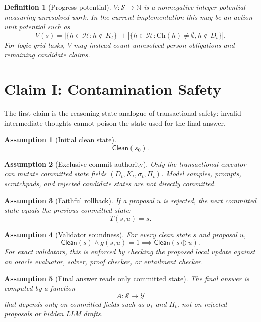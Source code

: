 \documentclass[11pt]{article}
\newtheorem{definition}{Definition}
\newtheorem{assumption}{Assumption}
\newcommand{\State}{\mathcal{S}}
\newcommand{\Obligations}{\mathcal{H}}
\newcommand{\Clean}{\mathsf{Clean}}
\newcommand{\pot}{V}
\begin{document}
\begin{definition}[Progress potential]
$\pot : \State \to \mathbb{N}$ is a nonnegative integer potential measuring
unresolved work. In the current implementation this may be an action-unit
potential such as
\[
\pot(s)=
|\{h \in \Obligations : h \notin K_t\}|
+
|\{h \in \Obligations : \mathrm{Ch}(h)\neq\emptyset, h\notin D_t\}|.
\]
For logic-grid tasks, $\pot$ may instead count unresolved person obligations and
remaining candidate claims.
\end{definition}

\section{Claim I: Contamination Safety}

The first claim is the reasoning-state analogue of transactional safety: invalid
intermediate thoughts cannot poison the state used for the final answer.

\begin{assumption}[Initial clean state]
\label{ass:initial-clean}
\[
\Clean(s_0).
\]
\end{assumption}

\begin{assumption}[Exclusive commit authority]
\label{ass:exclusive-commit}
Only the transactional executor can mutate committed state fields
$(D_t,K_t,\sigma_t,\Pi_t)$. Model samples, prompts, scratchpads, and rejected
candidate states are not directly committed.
\end{assumption}

\begin{assumption}[Faithful rollback]
\label{ass:faithful-rollback}
If a proposal $u$ is rejected, the next committed state equals the previous
committed state:
\[
T(s,u)=s.
\]
\end{assumption}

\begin{assumption}[Validator soundness]
\label{ass:validator-soundness}
For every clean state $s$ and proposal $u$,
\[
\Clean(s) \wedge g(s,u)=1 \implies \Clean(s \oplus u).
\]
For exact validators, this is enforced by checking the proposed local update
against an oracle evaluator, solver, proof checker, or entailment checker.
\end{assumption}

\begin{assumption}[Final answer reads only committed state]
\label{ass:answer-from-commit}
The final answer is computed by a function
\[
A : \State \to \mathcal{Y}
\]
that depends only on committed fields such as $\sigma_t$ and $\Pi_t$, not on
rejected proposals or hidden LLM drafts.
\end{assumption}
\end{document}
